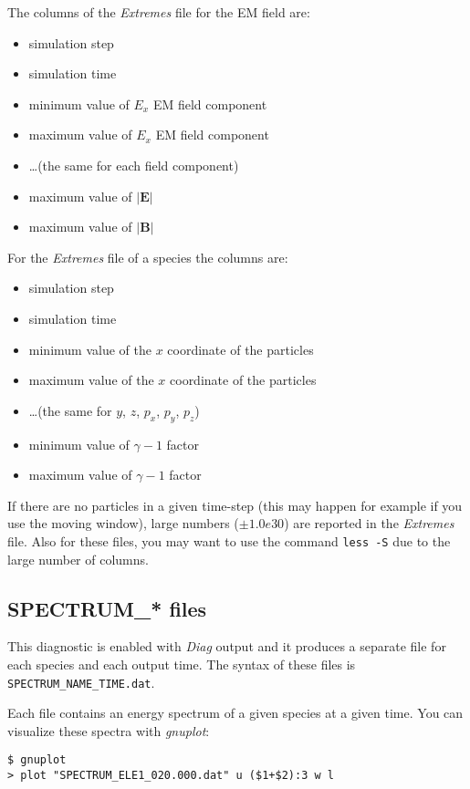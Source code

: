 \documentclass[11pt,a4paper]{report}
\begin{document}
The columns of the \emph{Extremes} file for the EM field are:
\begin{itemize}
\item simulation step
\item simulation time
\item minimum value of $E_x$ EM field component
\item maximum value of $E_x$ EM field component
\item \ldots (the same for each field component)
\item maximum value of ${\vert\mathbf{E}\vert}$
\item maximum value of ${\vert\mathbf{B}\vert}$
\end{itemize}
For the \emph{Extremes} file of a species the columns are:
\begin{itemize}
\item simulation step
\item simulation time
\item minimum value of the $x$ coordinate of the particles
\item maximum value of the $x$ coordinate of the particles
\item \ldots (the same for $y$, $z$, $p_x$, $p_y$, $p_z$)
\item minimum value of $\gamma - 1$ factor
\item maximum value of $\gamma - 1$ factor
\end{itemize}
If there are no particles in a given time-step (this may happen for example if you use the moving window), large numbers ($\pm 1.0e30$) are reported in the  \emph{Extremes} file.
Also for these files, you may want to use the command \verb+less -S+ due to the large number of columns.
\subsection{SPECTRUM\_* files}
This diagnostic is enabled with \emph{Diag} output and it produces a separate file for each species and each output time. The syntax of these files is \verb+SPECTRUM_NAME_TIME.dat+.

Each file contains an energy spectrum of a given species at a given time. You can visualize these spectra with \emph{gnuplot}:
\begin{verbatim}
$ gnuplot
> plot "SPECTRUM_ELE1_020.000.dat" u ($1+$2):3 w l
\end{verbatim}
\end{document}
